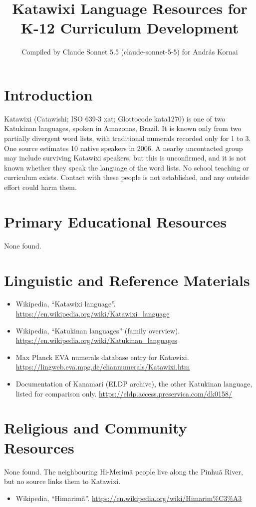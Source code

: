 \documentclass[12pt]{article}
\title{Katawixi Language Resources for K-12 Curriculum Development}
\author{Compiled by Claude Sonnet 5.5 (claude-sonnet-5-5) for Andr\'as Kornai}
\date{}
\begin{document}
\maketitle

\section{Introduction}
Katawixi (Catawishi; ISO 639-3 xat; Glottocode kata1270) is one of two Katukinan languages, spoken in Amazonas, Brazil. It is known only from two partially divergent word lists, with traditional numerals recorded only for 1 to 3. One source estimates 10 native speakers in 2006. A nearby uncontacted group may include surviving Katawixi speakers, but this is unconfirmed, and it is not known whether they speak the language of the word lists. No school teaching or curriculum exists. Contact with these people is not established, and any outside effort could harm them.

\section{Primary Educational Resources}
None found.

\section{Linguistic and Reference Materials}
\begin{itemize}
\item Wikipedia, ``Katawixi language''. \url{https://en.wikipedia.org/wiki/Katawixi_language}
\item Wikipedia, ``Katukinan languages'' (family overview). \url{https://en.wikipedia.org/wiki/Katukinan_languages}
\item Max Planck EVA numerals database entry for Katawixi. \url{https://lingweb.eva.mpg.de/channumerals/Katawixi.htm}
\item Documentation of Kanamari (ELDP archive), the other Katukinan language, listed for comparison only. \url{https://eldp.access.preservica.com/dk0158/}
\end{itemize}

\section{Religious and Community Resources}
None found. The neighbouring Hi-Merim\~a people live along the Pinhu\~a River, but no source links them to Katawixi.
\begin{itemize}
\item Wikipedia, ``Himarim\~a''. \url{https://en.wikipedia.org/wiki/Himarim%C3%A3}
\end{itemize}
\end{document}
